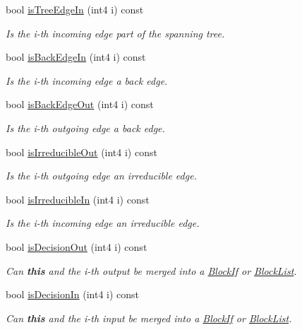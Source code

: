 \begin{DoxyCompactItemize}
bool \mbox{\hyperlink{class_flow_block_af06b13621f990b9e0d239cdc7f696c6c}{is\+Tree\+Edge\+In}} (int4 i) const
\begin{DoxyCompactList}\small\item\em Is the i-\/th incoming edge part of the spanning tree. \end{DoxyCompactList}\item 
bool \mbox{\hyperlink{class_flow_block_afcee72ac3b91ccd79a5360e3ff0346b9}{is\+Back\+Edge\+In}} (int4 i) const
\begin{DoxyCompactList}\small\item\em Is the i-\/th incoming edge a {\itshape back} edge. \end{DoxyCompactList}\item 
bool \mbox{\hyperlink{class_flow_block_a771408d6970a7e1d879b122fe6feb7d5}{is\+Back\+Edge\+Out}} (int4 i) const
\begin{DoxyCompactList}\small\item\em Is the i-\/th outgoing edge a {\itshape back} edge. \end{DoxyCompactList}\item 
bool \mbox{\hyperlink{class_flow_block_a02d6e487eff4b5460a8b9995e9bf1199}{is\+Irreducible\+Out}} (int4 i) const
\begin{DoxyCompactList}\small\item\em Is the i-\/th outgoing edge an irreducible edge. \end{DoxyCompactList}\item 
bool \mbox{\hyperlink{class_flow_block_ab3166d33e1501e01ad1e597ba7fc5a00}{is\+Irreducible\+In}} (int4 i) const
\begin{DoxyCompactList}\small\item\em Is the i-\/th incoming edge an irreducible edge. \end{DoxyCompactList}\item 
bool \mbox{\hyperlink{class_flow_block_a96f1d86554ed27136413d992238356f1}{is\+Decision\+Out}} (int4 i) const
\begin{DoxyCompactList}\small\item\em Can {\bfseries{this}} and the i-\/th output be merged into a \mbox{\hyperlink{class_block_if}{Block\+If}} or \mbox{\hyperlink{class_block_list}{Block\+List}}. \end{DoxyCompactList}\item 
bool \mbox{\hyperlink{class_flow_block_a905ae147d7a99ce2cfa5686b2f76193b}{is\+Decision\+In}} (int4 i) const
\begin{DoxyCompactList}\small\item\em Can {\bfseries{this}} and the i-\/th input be merged into a \mbox{\hyperlink{class_block_if}{Block\+If}} or \mbox{\hyperlink{class_block_list}{Block\+List}}. \end{DoxyCompactList}\item 

\end{DoxyCompactItemize}
